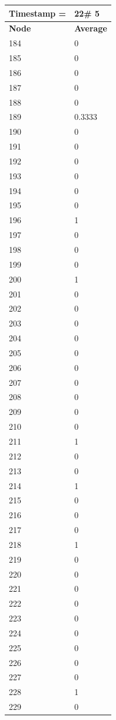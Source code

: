 \begin{tabular}{|l||l|}
\hline
\textbf{Timestamp =} & \textbf{22}\# 5\\\hline
	\textbf{Node} & \textbf{Average} \\ \hline
\hline
	184 & 0 \\ \hline
	185 & 0 \\ \hline
	186 & 0 \\ \hline
	187 & 0 \\ \hline
	188 & 0 \\ \hline
	189 & 0.3333 \\ \hline
	190 & 0 \\ \hline
	191 & 0 \\ \hline
	192 & 0 \\ \hline
	193 & 0 \\ \hline
	194 & 0 \\ \hline
	195 & 0 \\ \hline
	196 & 1 \\ \hline
	197 & 0 \\ \hline
	198 & 0 \\ \hline
	199 & 0 \\ \hline
	200 & 1 \\ \hline
	201 & 0 \\ \hline
	202 & 0 \\ \hline
	203 & 0 \\ \hline
	204 & 0 \\ \hline
	205 & 0 \\ \hline
	206 & 0 \\ \hline
	207 & 0 \\ \hline
	208 & 0 \\ \hline
	209 & 0 \\ \hline
	210 & 0 \\ \hline
	211 & 1 \\ \hline
	212 & 0 \\ \hline
	213 & 0 \\ \hline
	214 & 1 \\ \hline
	215 & 0 \\ \hline
	216 & 0 \\ \hline
	217 & 0 \\ \hline
	218 & 1 \\ \hline
	219 & 0 \\ \hline
	220 & 0 \\ \hline
	221 & 0 \\ \hline
	222 & 0 \\ \hline
	223 & 0 \\ \hline
	224 & 0 \\ \hline
	225 & 0 \\ \hline
	226 & 0 \\ \hline
	227 & 0 \\ \hline
	228 & 1 \\ \hline
	229 & 0 \\ \hline
\end{tabular}
